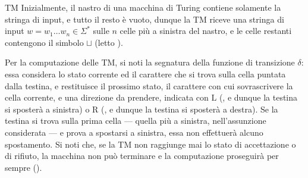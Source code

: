 \documentclass[a4paper, 12pt]{report}
\begin{document}
\begin{frameddefn}[label={tm}, breakable]{TM}
        Inizialmente, il nastro di una macchina di Turing contiene solamente la stringa di input, e tutto il resto è vuoto, dunque la TM riceve una stringa di input $w = w_1 \ldots w_n \in \Sigma^*$ sulle $n$ celle più a sinistra del nastro, e le celle restanti contengono il simbolo $\sqcup$ (letto ).

        Per la computazione delle TM, si noti la segnatura della funzione di transizione $\delta$: essa considera lo stato corrente ed il carattere che si trova sulla cella puntata dalla testina, e restituisce il prossimo stato, il carattere con cui sovrascrivere la cella corrente, e una direzione da prendere, indicata con $\mathrm L$ (, e dunque la testina si sposterà a sinistra) o $\mathrm R$ (, e dunque la testina si sposterà a destra). Se la testina si trova sulla prima cella --- quella più a sinistra, nell'assunzione considerata --- e prova a spostarsi a sinistra, essa non effettuerà alcuno spostamento. Si noti che, se la TM non raggiunge mai lo stato di accettazione o di rifiuto, la macchina non può terminare e la computazione proseguirà per sempre ().
    \end{frameddefn}
\end{document}
